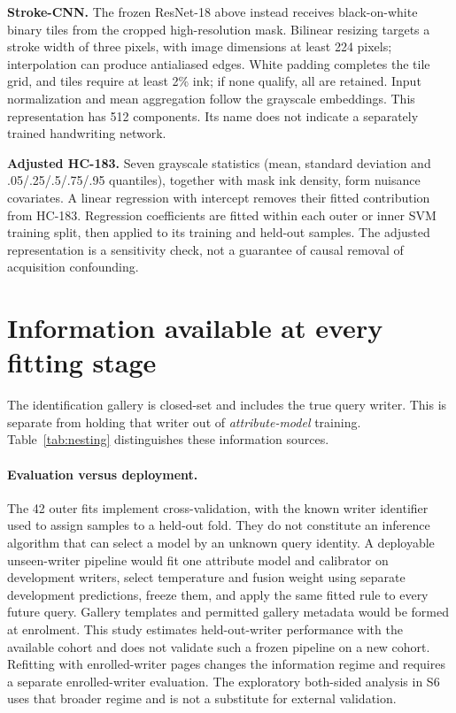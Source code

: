 \documentclass[10pt,a4paper]{article}
\begin{document}
\textbf{Stroke-CNN.} The frozen ResNet-18 above instead receives black-on-white binary tiles from the cropped high-resolution mask. Bilinear resizing targets a stroke width of three pixels, with image dimensions at least 224 pixels; interpolation can produce antialiased edges. White padding completes the tile grid, and tiles require at least 2\% ink; if none qualify, all are retained. Input normalization and mean aggregation follow the grayscale embeddings. This representation has 512 components. Its name does not indicate a separately trained handwriting network.

\textbf{Adjusted HC-183.} Seven grayscale statistics (mean, standard deviation and .05/.25/.5/.75/.95 quantiles), together with mask ink density, form nuisance covariates. A linear regression with intercept removes their fitted contribution from HC-183. Regression coefficients are fitted within each outer or inner SVM training split, then applied to its training and held-out samples. The adjusted representation is a sensitivity check, not a guarantee of causal removal of acquisition confounding.

\section{Information available at every fitting stage}
The identification gallery is closed-set and includes the true query writer. This is separate from holding that writer out of \emph{attribute-model} training. Table~\ref{tab:nesting} distinguishes these information sources.

\paragraph{Evaluation versus deployment.} The 42 outer fits implement cross-validation, with the known writer identifier used to assign samples to a held-out fold. They do not constitute an inference algorithm that can select a model by an unknown query identity. A deployable unseen-writer pipeline would fit one attribute model and calibrator on development writers, select temperature and fusion weight using separate development predictions, freeze them, and apply the same fitted rule to every future query. Gallery templates and permitted gallery metadata would be formed at enrolment. This study estimates held-out-writer performance with the available cohort and does not validate such a frozen pipeline on a new cohort. Refitting with enrolled-writer pages changes the information regime and requires a separate enrolled-writer evaluation. The exploratory both-sided analysis in S6 uses that broader regime and is not a substitute for external validation.
\end{document}
